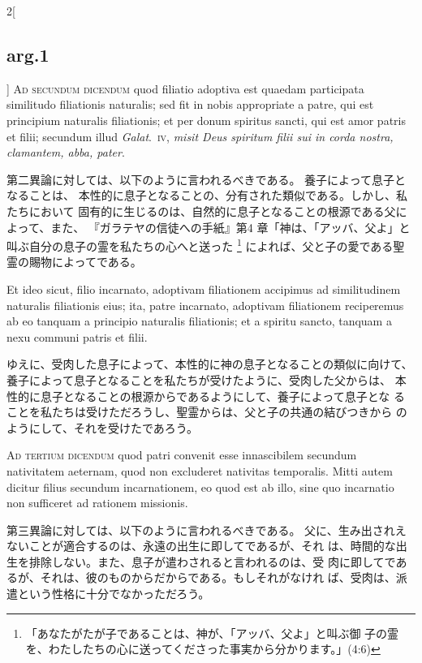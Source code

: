 \documentclass[paper=a4paper,fontsize=10pt,jafontsize=9pt,titlepage]{jlreq}
\begin{document}
\begin{paracol}{2}[\subsection{arg.1}]
{\scshape Ad secundum dicendum} quod filiatio adoptiva est quaedam participata
similitudo filiationis naturalis; sed fit in nobis appropriate a patre,
qui est principium naturalis filiationis; et per donum spiritus sancti,
qui est amor patris et filii; secundum illud {\itshape Galat}.~{\scshape iv}, {\itshape misit Deus
spiritum filii sui in corda nostra, clamantem, abba, pater}.

\switchcolumn

第二異論に対しては、以下のように言われるべきである。
養子によって息子となることは、
 本性的に息子となることの、分有された類似である。しかし、私たちにおいて
 固有的に生じるのは、自然的に息子となることの根源である父によって、また、
 『ガラテヤの信徒への手紙』第4
 章「神は、「アッバ、父よ」と叫ぶ自分の息子の霊を私たちの心へと送った
 \footnote{「あなたがたが子であることは、神が、「アッバ、父よ」と叫ぶ御
 子の霊を、わたしたちの心に送ってくださった事実から分かります。」(4:6)}
 によれば、父と子の愛である聖霊の賜物によってである。

\switchcolumn*

Et ideo
sicut, filio incarnato, adoptivam filiationem accipimus ad similitudinem
naturalis filiationis eius; ita, patre incarnato, adoptivam filiationem
reciperemus ab eo tanquam a principio naturalis filiationis; et a
spiritu sancto, tanquam a nexu communi patris et filii.

\switchcolumn

ゆえに、受肉した息子によって、本性的に神の息子となることの類似に向けて、
 養子によって息子となることを私たちが受けたように、受肉した父からは、
 本性的に息子となることの根源からであるようにして、養子によって息子とな
 ることを私たちは受けただろうし、聖霊からは、父と子の共通の結びつきから
 のようにして、それを受けたであろう。

\switchcolumn*[\subsection{ad.3}]

{\scshape Ad tertium dicendum} quod patri convenit esse innascibilem secundum
nativitatem aeternam, quod non excluderet nativitas temporalis. Mitti
autem dicitur filius secundum incarnationem, eo quod est ab illo, sine
quo incarnatio non sufficeret ad rationem missionis.

\switchcolumn

第三異論に対しては、以下のように言われるべきである。
父に、生み出されえないことが適合するのは、永遠の出生に即してであるが、それ
 は、時間的な出生を排除しない。また、息子が遣わされると言われるのは、受
 肉に即してであるが、それは、彼のものからだからである。もしそれがなけれ
 ば、受肉は、派遣という性格に十分でなかっただろう。

\end{paracol}
\newpage
{}
{}
\setcounter{section}{6}
\setcounter{subsection}{0}
\end{document}
